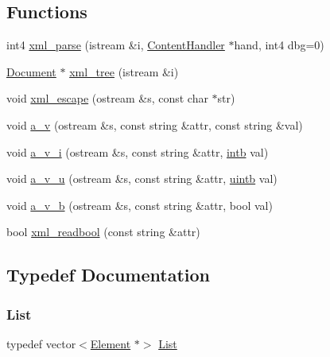 \subsection*{Functions}
\begin{DoxyCompactItemize}
\item 
int4 \mbox{\hyperlink{xml_8hh_acb2e6147fb537978820f563506f8e0ff}{xml\+\_\+parse}} (istream \&i, \mbox{\hyperlink{class_content_handler}{Content\+Handler}} $\ast$hand, int4 dbg=0)
\item 
\mbox{\hyperlink{class_document}{Document}} $\ast$ \mbox{\hyperlink{xml_8hh_a4e0d1051f142e3711986dbb797049769}{xml\+\_\+tree}} (istream \&i)
\item 
void \mbox{\hyperlink{xml_8hh_a18ba74ef06228bed0b1eff1f1abbb7ef}{xml\+\_\+escape}} (ostream \&s, const char $\ast$str)
\item 
void \mbox{\hyperlink{xml_8hh_a0fa1b18d881c70abd1489da2ba2f6792}{a\+\_\+v}} (ostream \&s, const string \&attr, const string \&val)
\item 
void \mbox{\hyperlink{xml_8hh_aa12f4a381037faf4e90d1876bb44aa02}{a\+\_\+v\+\_\+i}} (ostream \&s, const string \&attr, \mbox{\hyperlink{types_8h_aa925ba3e627c2df89d5b1cfe84fb8572}{intb}} val)
\item 
void \mbox{\hyperlink{xml_8hh_af098b9ed0ffa95b5f853eb3f88ec7064}{a\+\_\+v\+\_\+u}} (ostream \&s, const string \&attr, \mbox{\hyperlink{types_8h_a2db313c5d32a12b01d26ac9b3bca178f}{uintb}} val)
\item 
void \mbox{\hyperlink{xml_8hh_a87634423f394bc832a51957ee6fc85c9}{a\+\_\+v\+\_\+b}} (ostream \&s, const string \&attr, bool val)
\item 
bool \mbox{\hyperlink{xml_8hh_ac2d01d7c2986f1143b2f6145311d093e}{xml\+\_\+readbool}} (const string \&attr)
\end{DoxyCompactItemize}


\subsection{Typedef Documentation}
\mbox{\label{xml_8hh_ab5ab62f46b3735557c125f91b40ac155}} 
\subsubsection{\texorpdfstring{List}{List}}
{\footnotesize\ttfamily typedef vector$<$\mbox{\hyperlink{class_element}{Element}} $\ast$$>$ \mbox{\hyperlink{xml_8hh_ab5ab62f46b3735557c125f91b40ac155}{List}}}



